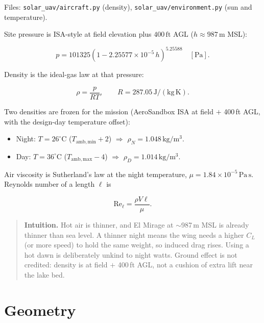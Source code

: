 \documentclass[11pt,letterpaper]{article}
\newcommand{\code}[1]{\texttt{#1}}
\newenvironment{intuition}{\begin{quote}\small}{\end{quote}}
\begin{document}
Files: \code{solar\_uav/aircraft.py} (density), \code{solar\_uav/environment.py} (sun and temperature).

Site pressure is ISA-style at field elevation plus $400\,\mathrm{ft}$ AGL ($h \approx 987\,\mathrm{m}$ MSL):

\begin{equation}
  p = 101325
  \left(1 - 2.25577\times 10^{-5}\, h\right)^{5.25588}
  \quad [\mathrm{Pa}].
\end{equation}

Density is the ideal-gas law at that pressure:

\begin{equation}
  \rho = \frac{p}{R T}, \qquad R = 287.05\,\mathrm{J/(kg\,K)}.
\end{equation}

Two densities are frozen for the mission (AeroSandbox ISA at field $+$ 400\,ft AGL, with the design-day temperature offset):

\begin{itemize}
  \item Night: $T = 26^\circ\mathrm{C}$ ($T_\mathrm{amb,min}+2$) $\Rightarrow$ $\rho_N = 1.048\,\mathrm{kg/m^3}$.
  \item Day: $T = 36^\circ\mathrm{C}$ ($T_\mathrm{amb,max}-4$) $\Rightarrow$ $\rho_D = 1.014\,\mathrm{kg/m^3}$.
\end{itemize}

Air viscosity is Sutherland's law at the night temperature, $\mu = 1.84\times 10^{-5}\,\mathrm{Pa\,s}$. Reynolds number of a length $\ell$ is

\begin{equation}
  \mathrm{Re}_\ell = \frac{\rho V \ell}{\mu}.
\end{equation}

\begin{intuition}
\textbf{Intuition.} Hot air is thinner, and El Mirage at $\sim$987\,m MSL is already thinner than sea level. A thinner night means the wing needs a higher $C_L$ (or more speed) to hold the same weight, so induced drag rises. Using a hot dawn is deliberately unkind to night watts. Ground effect is not credited: density is at field $+$ 400\,ft AGL, not a cushion of extra lift near the lake bed.
\end{intuition}

\section{Geometry}
\end{document}
